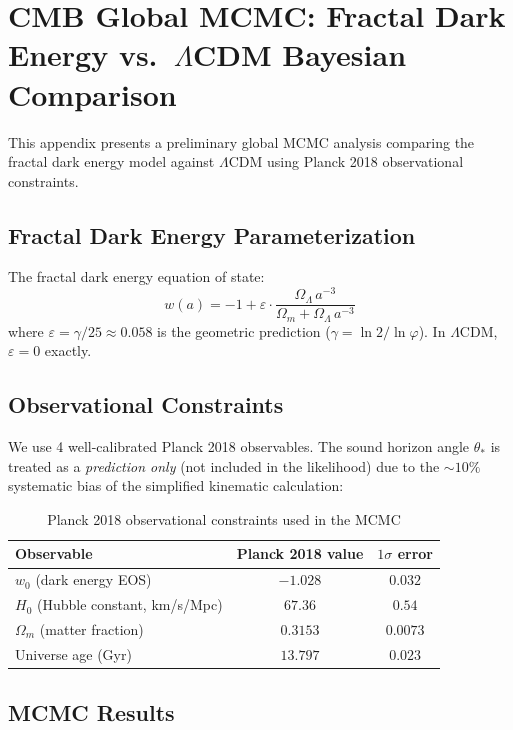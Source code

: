 \documentclass[12pt,a4paper,twocolumn]{article}
\renewcommand{\phi}{\varphi}
\begin{document}
\section{CMB Global MCMC: Fractal Dark Energy vs.\ $\Lambda$CDM Bayesian Comparison}
\label{app:cmb_mcmc}

This appendix presents a preliminary global MCMC analysis comparing the fractal dark energy model against $\Lambda$CDM using Planck 2018 observational constraints.

\subsection{Fractal Dark Energy Parameterization}
The fractal dark energy equation of state:
\[
w(a) = -1 + \varepsilon \cdot \frac{\Omega_\Lambda \, a^{-3}}{\Omega_m + \Omega_\Lambda \, a^{-3}}
\]
where $\varepsilon = \gamma / 25 \approx 0.058$ is the geometric prediction ($\gamma = \ln 2 / \ln \phi$). In $\Lambda$CDM, $\varepsilon = 0$ exactly.

\subsection{Observational Constraints}
We use 4 well-calibrated Planck 2018 observables. The sound horizon angle $\theta_*$ is treated as a \emph{prediction only} (not included in the likelihood) due to the $\sim 10\%$ systematic bias of the simplified kinematic calculation:

\begin{table}[H]
\centering
\caption{Planck 2018 observational constraints used in the MCMC}
\label{tab:planck_obs}
\begin{tabular}{l|c|c}
\hline
Observable & Planck 2018 value & $1\sigma$ error \\
\hline
$w_0$ (dark energy EOS) & $-1.028$ & $0.032$ \\
$H_0$ (Hubble constant, km/s/Mpc) & $67.36$ & $0.54$ \\
$\Omega_m$ (matter fraction) & $0.3153$ & $0.0073$ \\
Universe age (Gyr) & $13.797$ & $0.023$ \\
\hline
\end{tabular}
\end{table}

\subsection{MCMC Results}
\end{document}

